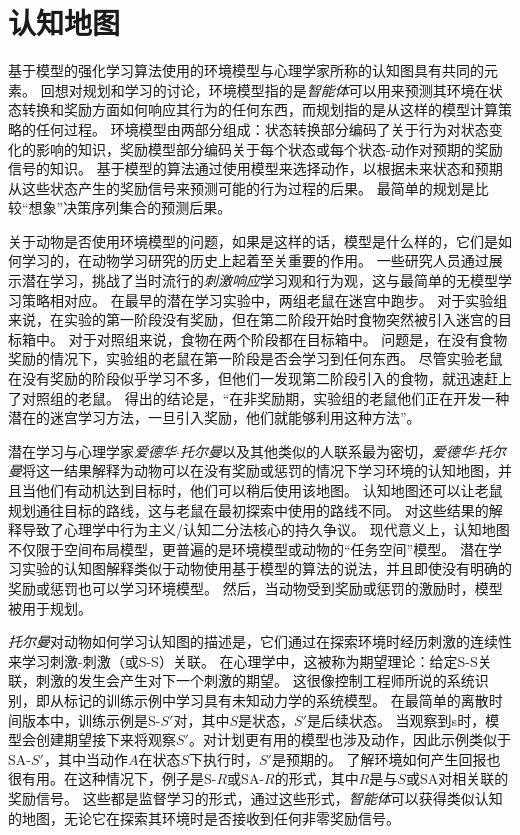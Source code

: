 \section{认知地图} \label{sec:cognitive_maps}

基于模型的强化学习算法使用的环境模型与心理学家所称的认知图具有共同的元素。
回想对规划和学习的讨论，环境模型指的是\textit{智能体}可以用来预测其环境在状态转换和奖励方面如何响应其行为的任何东西，而规划指的是从这样的模型计算策略的任何过程。
环境模型由两部分组成：状态转换部分编码了关于行为对状态变化的影响的知识，奖励模型部分编码关于每个状态或每个状态-动作对预期的奖励信号的知识。
基于模型的算法通过使用模型来选择动作，以根据未来状态和预期从这些状态产生的奖励信号来预测可能的行为过程的后果。
最简单的规划是比较“想象”决策序列集合的预测后果。


关于动物是否使用环境模型的问题，如果是这样的话，模型是什么样的，它们是如何学习的，在动物学习研究的历史上起着至关重要的作用。
一些研究人员通过展示潜在学习，挑战了当时流行的\textit{刺激响应}学习观和行为观，这与最简单的无模型学习策略相对应。
在最早的潜在学习实验中，两组老鼠在迷宫中跑步。
对于实验组来说，在实验的第一阶段没有奖励，但在第二阶段开始时食物突然被引入迷宫的目标箱中。
对于对照组来说，食物在两个阶段都在目标箱中。
问题是，在没有食物奖励的情况下，实验组的老鼠在第一阶段是否会学习到任何东西。
尽管实验老鼠在没有奖励的阶段似乎学习不多，但他们一发现第二阶段引入的食物，就迅速赶上了对照组的老鼠。
得出的结论是，“在非奖励期，实验组的老鼠他们正在开发一种潜在的迷宫学习方法，一旦引入奖励，他们就能够利用这种方法”\cite{blodgett1929effect}。



潜在学习与心理学家\textit{爱德华$\cdot$托尔曼}以及其他类似的人联系最为密切，\textit{爱德华$\cdot$托尔曼}将这一结果解释为动物可以在没有奖励或惩罚的情况下学习环境的认知地图，并且当他们有动机达到目标时，他们可以稍后使用该地图\cite{tolman1948cognitive}。
认知地图还可以让老鼠规划通往目标的路线，这与老鼠在最初探索中使用的路线不同。
对这些结果的解释导致了心理学中行为主义/认知二分法核心的持久争议。
现代意义上，认知地图不仅限于空间布局模型，更普遍的是环境模型或动物的“任务空间”模型\cite{wilson2014orbitofrontal}。
潜在学习实验的认知图解释类似于动物使用基于模型的算法的说法，并且即使没有明确的奖励或惩罚也可以学习环境模型。
然后，当动物受到奖励或惩罚的激励时，模型被用于规划。


\textit{托尔曼}对动物如何学习认知图的描述是，它们通过在探索环境时经历刺激的连续性来学习刺激-刺激（或S-S）关联。
在心理学中，这被称为期望理论：给定S-S关联，刺激的发生会产生对下一个刺激的期望。
这很像控制工程师所说的系统识别，即从标记的训练示例中学习具有未知动力学的系统模型。
在最简单的离散时间版本中，训练示例是S-$S'$对，其中$S$是状态，$S'$是后续状态。
当观察到s时，模型会创建期望接下来将观察$S'$。对计划更有用的模型也涉及动作，因此示例类似于SA-$S'$，其中当动作$ A $在状态$ S $下执行时，$ S' $是预期的。
了解环境如何产生回报也很有用。在这种情况下，例子是S-$ R $或SA-$ R $的形式，其中$ R $是与$ S $或SA对相关联的奖励信号。
这些都是监督学习的形式，通过这些形式，\textit{智能体}可以获得类似认知的地图，无论它在探索其环境时是否接收到任何非零奖励信号。


